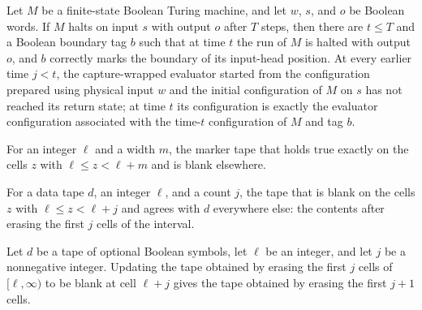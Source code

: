 \begin{lemma}
\label{Turing.FinTM.emCall_eval_first}
\leanok
{}
Let $M$ be a finite-state Boolean Turing machine, and let $w$, $s$, and $o$ be Boolean
words. If $M$ halts on input $s$ with output $o$ after $T$ steps, then there are $t\le
T$ and a Boolean boundary tag $b$ such that at time $t$ the run of $M$ is halted with
output $o$, and $b$ correctly marks the boundary of its input-head position. At every
earlier time $j<t$, the capture-wrapped evaluator started from the configuration
prepared using physical input $w$ and the initial configuration of $M$ on $s$ has not
reached its return state; at time $t$ its configuration is exactly the evaluator
configuration associated with the time-$t$ configuration of $M$ and tag $b$.
\end{lemma}

\begin{definition}
\label{Turing.FinTM.emCallInterval}
\leanok
For an integer $\ell$ and a width $m$, the marker tape that holds $\mathrm{true}$
exactly on the cells $z$ with $\ell \le z < \ell + m$ and is blank elsewhere.
\end{definition}

\begin{definition}
\label{Turing.FinTM.emCallCleared}
\leanok
For a data tape $d$, an integer $\ell$, and a count $j$, the tape that is blank on the
cells $z$ with $\ell \le z < \ell + j$ and agrees with $d$ everywhere else: the contents
after erasing the first $j$ cells of the interval.
\end{definition}

\begin{lemma}
\label{Turing.FinTM.emCall_cleared_step}
\leanok
{}
Let $d$ be a tape of optional Boolean symbols, let $\ell$ be an integer, and let $j$ be
a nonnegative integer. Updating the tape obtained by erasing the first $j$ cells of
$[\ell,\infty)$ to be blank at cell $\ell+j$ gives the tape obtained by erasing the
first $j+1$ cells.
\end{lemma}

